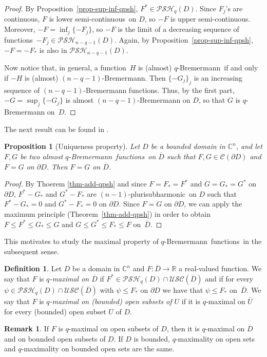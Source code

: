 \documentclass[reqno]{amsart}
\newtheorem{prop}[thm]{Proposition}
\theoremstyle{definition}
\newtheorem{defn}[thm]{Definition}
\newtheorem{rem}[thm]{Remark}
\numberwithin{equation}{section}
\newcommand{\cbb}{\mathbb{C}}
\newcommand{\rbb}{\mathbb{R}}
\newcommand{\ccal}{\mathcal{C}}
\newcommand{\USC}{\mathcal{USC}}
\newcommand{\qbrem}{$q$-Bremermann}
\newcommand{\psh}{pluri\-sub\-harmonic}
\newcommand{\PSH}{\mathcal{PSH}}
\newcommand{\cl}[1]{\overline{#1}}
\newcommand{\cont}{continuous}
\newcommand{\usc}{upper semi-continuous}
\newcommand{\lsc}{lower semi-continuous}
\newcommand{\fct}{function}
\newcommand{\fcts}{functions}
\newcommand{\cld}{\overline{D}}
\begin{document}
\begin{proof} By Proposition~\ref{prop-sup-inf-qpsh}, $F^* \in \PSH_q(D)$. Since $F_j$'s are \cont, $F$ is \lsc\ on $D$, so $-F$ is \usc. Moreover, $-F=\inf_j\{-F_j\}$, so $-F$ is the limit of a decreasing sequence of \fcts\ $-F_j \in \PSH_{n-q-1}(D)$. Again, by Proposition~\ref{prop-sup-inf-qpsh}, $-F=-F_*$ is also in $\PSH_{n-q-1}(D)$.

Now notice that, in general, a \fct\ $H$ is (almost) \qbrem\ if and only if $-H$ is (almost) $(n-q-1)$-Bremermann. Then $\{-G_j\}_j$ is an increasing sequence of $(n-q-1)$-Bremermann \fcts. Thus, by the first part, $-G=\sup_j\{-G_j\}$ is almost $(n-q-1)$-Bremermann on $D$, so that $G$ is $q$-Bremermann on~$D$.
\end{proof}

The next result can be found in \cite{Sl84}.

\begin{prop}[Uniqueness property]\label{prop-unique-qbrem} Let $D$ be a bounded domain in $\cbb^n$, and let $F,G$ be two almost \qbrem\ \fcts\ on $\cl{D}$ such that $F,G \in \ccal(\partial D)$ and $F=G$ on $\partial D$. Then $F=G$ on $\cld$.
\end{prop}

\begin{proof} By Thoerem \ref{thm-add-qpsh} and since $F=F_*=F^*$ and $G=G_*=G^*$ on $\partial D$, $F^*-G_*$ and $G^*-F_*$ are $(n-1)$-\psh\ on $D$ such that $F^*-G_*= 0$ and $G^*-F_*=0$ on $\partial D$. Since $F=G$ on $\partial D$, we can apply the maximum principle (Theorem~\ref{thm-add-qpsh}) in order to obtain $F\leq F^* \leq G_* \leq G$ and $G\leq G^* \leq F_* \leq F$ on~$\cld$.
\end{proof}

This motivates to study the maximal property of \qbrem\ \fcts\ in the subsequent sense.

\begin{defn} Let $D$ be a domain in $\cbb^n$ and $F:\cld \to \rbb$ a real-valued \fct. We say that $F$ is \textit{$q$-maximal on $\cld$} if $F^*\in\PSH_q(D)\cap\USC(\cld)$ and if for every $\psi \in \PSH_q(D)\cap\USC(\cl{D})$ with $\psi \leq F_*$ on $\partial D$ we have that $\psi \leq F_*$ on~$\cld$. We say that $F$ is \textit{$q$-maximal on (bounded) open subsets of $U$} if it is $q$-maximal on $\cl{U}$ for every (bounded) open subset $U$ of $D$.
\end{defn}

\begin{rem} If $F$ is $q$-maximal on open subsets of $D$, then it is $q$-maximal on $\cld$ and on bounded open subsets of $D$. If $D$ is bounded, $q$-maximality on open sets and $q$-maximality on bounded open sets are the same.
\end{rem}
\end{document}
